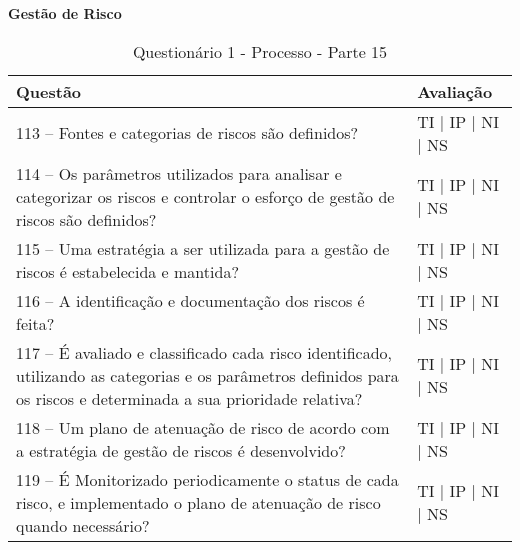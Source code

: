 \documentclass[openany,10pt,a4paper]{article}
\begin{document}
\begin{longtable}
\begin{appendix}
\begin{table}[h]
\textbf{Gestão de Risco}
	\centering
	\caption{Questionário 1 - Processo - Parte 15}
	\begin{tabular}{p{3.5in}p{2in}}		
		\toprule
		\textbf{Questão}  & \textbf{Avaliação}\\ 
		\midrule
		113 – Fontes e categorias de riscos são definidos?
 & TI | IP | NI | NS \\
        \midrule
		114 – Os parâmetros utilizados para analisar e categorizar os riscos e controlar o esforço de 
gestão de riscos são definidos?
 & TI | IP | NI | NS \\
		\midrule
		115 – Uma estratégia a ser utilizada para a gestão de riscos é estabelecida e mantida?
 & TI | IP | NI | NS \\
		\midrule
        116 – A identificação e documentação dos riscos é feita?
 & TI | IP | NI | NS \\
		\midrule
	117 – É avaliado e classificado cada risco identificado, utilizando as categorias e os parâmetros 
definidos para os riscos e determinada a sua prioridade relativa?
  & TI | IP | NI | NS \\
		\midrule
		118 – Um plano de atenuação de risco de acordo com a estratégia de gestão de riscos é 
desenvolvido?
 & TI | IP | NI | NS \\
 \midrule
		119 – É Monitorizado periodicamente o status de cada risco, e implementado o plano de 
atenuação de risco quando necessário?
 & TI | IP | NI | NS \\
		\bottomrule
	\end{tabular} 
	\label{tab:tabela1}
\end{table}


\end{appendix}
\end{longtable}
\end{document}
